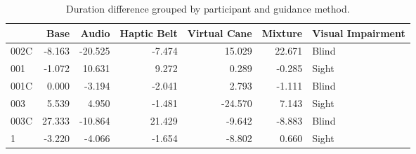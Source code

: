 
\begin{table}[!htb]
\centering
\caption{Duration difference grouped by participant and guidance method.}
\label{tab:duracao_var}
\begin{tabular}{lrrrrrl}
\toprule
{} &   Base &   Audio &  Haptic Belt &  Virtual Cane &  Mixture & Visual Impairment \\
\midrule
002C & -8.163 & -20.525 &       -7.474 &        15.029 &   22.671 &             Blind \\
001  & -1.072 &  10.631 &        9.272 &         0.289 &   -0.285 &             Sight \\
001C &  0.000 &  -3.194 &       -2.041 &         2.793 &   -1.111 &             Blind \\
003  &  5.539 &   4.950 &       -1.481 &       -24.570 &    7.143 &             Sight \\
003C & 27.333 & -10.864 &       21.429 &        -9.642 &   -8.883 &             Blind \\
1    & -3.220 &  -4.066 &       -1.654 &        -8.802 &    0.660 &             Sight \\
\bottomrule
\end{tabular}
\end{table}


